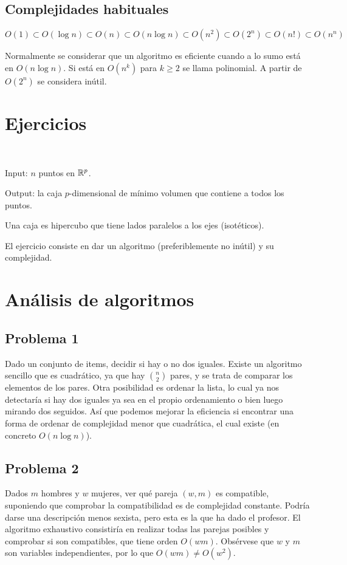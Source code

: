 \documentclass[AL.tex]{subfiles}
\begin{document}
\subsection{Complejidades habituales}

$O(1)\subset O(\log n)\subset O(n)\subset O(n\log n)\subset O(n^2)\subset O(2^n)\subset O(n!)\subset O(n^n)$

Normalmente se considerar que un algoritmo es eficiente cuando a lo sumo está en $O(n\log n)$. Si está en $O(n^k)$ para $k\geq 2$ se llama polinomial. A partir de $O(2^n)$ se considera inútil.


\section{Ejercicios}

\begin{ejer}\

Input: $n$ puntos en $\mathbb{R}^p$. 

Output: la caja $p$-dimensional de mínimo volumen que contiene a todos los puntos. 

Una caja es hipercubo que tiene lados paralelos a los ejes (isotéticos). 

El ejercicio consiste en dar un algoritmo (preferiblemente no inútil) y su complejidad.

\end{ejer}

\section{Análisis de algoritmos}

\subsection{Problema 1}
Dado un conjunto de items, decidir si hay o no dos iguales. Existe un algoritmo sencillo que es cuadrático, ya que hay $\binom{n}{2}$ pares, y se trata de comparar los elementos de los pares. Otra posibilidad es ordenar la lista, lo cual ya nos detectaría si hay dos iguales ya sea en el propio ordenamiento o bien luego mirando dos seguidos. Así que podemos mejorar la eficiencia si encontrar una forma de ordenar de complejidad menor que cuadrática, el cual existe (en concreto $O(n\log n)$).

\subsection{Problema 2}
Dados $m$ hombres y $w$ mujeres, ver qué pareja $(w,m)$ es compatible, suponiendo que comprobar la compatibilidad es de complejidad constante. Podría darse una descripción menos sexista, pero esta es la que ha dado el profesor. El algoritmo exhaustivo consistiría en realizar todas las parejas posibles y comprobar si son compatibles, que tiene orden $O(wm)$. Obsérvese que $w$ y $m$ son variables independientes, por lo que $O(wm)\neq O(w^2)$. 
\end{document}
